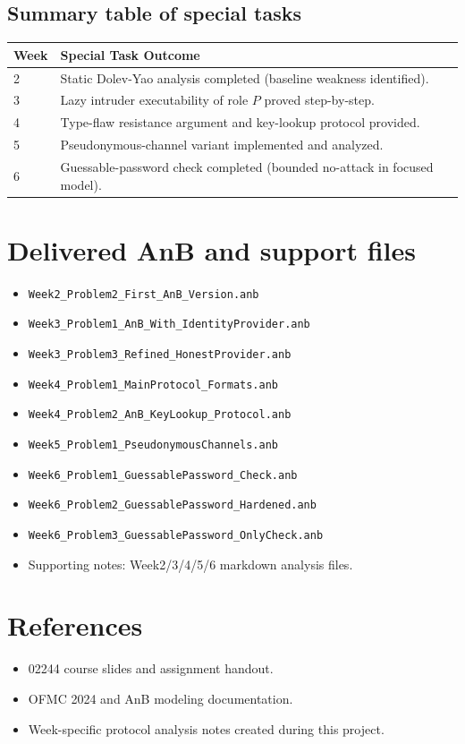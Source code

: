 \documentclass[11pt,a4paper]{article}
\begin{document}
\subsection{Summary table of special tasks}
\begin{center}
\begin{tabular}{ll}
\toprule
\textbf{Week} & \textbf{Special Task Outcome} \\
\midrule
2 & Static Dolev-Yao analysis completed (baseline weakness identified). \\
3 & Lazy intruder executability of role $P$ proved step-by-step. \\
4 & Type-flaw resistance argument and key-lookup protocol provided. \\
5 & Pseudonymous-channel variant implemented and analyzed. \\
6 & Guessable-password check completed (bounded no-attack in focused model). \\
\bottomrule
\end{tabular}
\end{center}

\newpage
\section*{Delivered AnB and support files}
\begin{itemize}
  \item \texttt{Week2\_Problem2\_First\_AnB\_Version.anb}
  \item \texttt{Week3\_Problem1\_AnB\_With\_IdentityProvider.anb}
  \item \texttt{Week3\_Problem3\_Refined\_HonestProvider.anb}
  \item \texttt{Week4\_Problem1\_MainProtocol\_Formats.anb}
  \item \texttt{Week4\_Problem2\_AnB\_KeyLookup\_Protocol.anb}
  \item \texttt{Week5\_Problem1\_PseudonymousChannels.anb}
  \item \texttt{Week6\_Problem1\_GuessablePassword\_Check.anb}
  \item \texttt{Week6\_Problem2\_GuessablePassword\_Hardened.anb}
  \item \texttt{Week6\_Problem3\_GuessablePassword\_OnlyCheck.anb}
  \item Supporting notes: Week2/3/4/5/6 markdown analysis files.
\end{itemize}

\section*{References}
\begin{itemize}
  \item 02244 course slides and assignment handout.
  \item OFMC 2024 and AnB modeling documentation.
  \item Week-specific protocol analysis notes created during this project.
\end{itemize}
\end{document}
